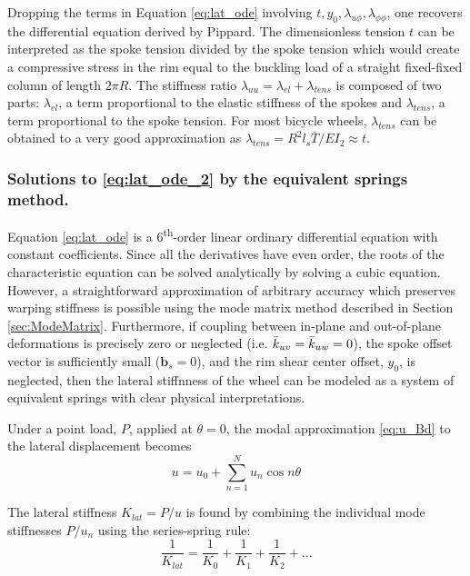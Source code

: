 \documentclass[\rootdir/thesis.tex]{subfiles}
\begin{document}
Dropping the terms in Equation \eqref{eq:lat_ode} involving $t, y_0, \lambda_{u\phi}, \lambda_{\phi\phi}$, one recovers the differential equation derived by Pippard\cite{Pippard1932a}. The dimensionless tension $t$ can be interpreted as the spoke tension divided by the spoke tension which would create a compressive stress in the rim equal to the buckling load of a straight fixed-fixed column of length $2\pi R$. The stiffness ratio $\lambda_{uu}=\lambda_{el}+\lambda_{tens}$ is composed of two parts: $\lambda_{el}$, a term proportional to the elastic stiffness of the spokes and $\lambda_{tens}$, a term proportional to the spoke tension. For most bicycle wheels, $\lambda_{tens}$ can be obtained to a very good approximation as $\lambda_{tens} = R^2l_s\bar{T}/EI_2 \approx t$.

\subsubsection{Solutions to \eqref{eq:lat_ode_2} by the equivalent springs method.}
\label{sec:equiv_springs}

Equation \eqref{eq:lat_ode} is a 6\textsuperscript{th}-order linear ordinary differential equation with constant coefficients. Since all the derivatives have even order, the roots of the characteristic equation can be solved analytically by solving a cubic equation. However, a straightforward approximation of arbitrary accuracy which preserves warping stiffness is possible using the mode matrix method described in Section \ref{sec:ModeMatrix}. Furthermore, if coupling between in-plane and out-of-plane deformations is precisely zero or neglected (i.e. $\bar{k}_{uv} = \bar{k}_{uw} = 0$), the spoke offset vector is sufficiently small ($\mathbf{b}_s=0$), and the rim shear center offset, $y_0$, is neglected, then the lateral stiffnness of the wheel can be modeled as a system of equivalent springs with clear physical interpretations.

Under a point load, $P$, applied at $\theta=0$, the modal approximation \eqref{eq:u_Bd} to the lateral displacement becomes
\begin{equation}
\label{eq:u_kequiv}
u = u_0 + \sum_{n=1}^N u_n \cos{n\theta}
\end{equation}

The lateral stiffness $K_{lat}=P/u$ is found by combining the individual mode stiffnesses $P/u_n$ using the series-spring rule:
\begin{equation}
\label{eq:Klat_series}
\frac{1}{K_{lat}} = \frac{1}{K_0} + \frac{1}{K_1} + \frac{1}{K_2} + \dots
\end{equation}
\end{document}
